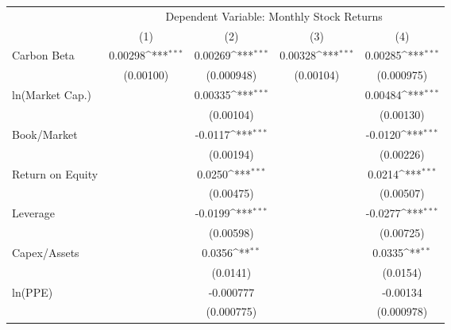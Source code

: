 {
\def\sym#1{\ifmmode^{#1}\else\(^{#1}\)\fi}
\begin{tabular}{l*{4}{c}}
\hline\hline
                    &\multicolumn{4}{c}{Dependent Variable: Monthly Stock Returns}                          \\\cmidrule(lr){2-5}
                    &\multicolumn{1}{c}{(1)}         &\multicolumn{1}{c}{(2)}         &\multicolumn{1}{c}{(3)}         &\multicolumn{1}{c}{(4)}         \\
\hline
Carbon Beta         &     0.00298\sym{***}&     0.00269\sym{***}&     0.00328\sym{***}&     0.00285\sym{***}\\
                    &   (0.00100)         &  (0.000948)         &   (0.00104)         &  (0.000975)         \\
ln(Market Cap.)     &                     &     0.00335\sym{***}&                     &     0.00484\sym{***}\\
                    &                     &   (0.00104)         &                     &   (0.00130)         \\
Book/Market         &                     &     -0.0117\sym{***}&                     &     -0.0120\sym{***}\\
                    &                     &   (0.00194)         &                     &   (0.00226)         \\
Return on Equity    &                     &      0.0250\sym{***}&                     &      0.0214\sym{***}\\
                    &                     &   (0.00475)         &                     &   (0.00507)         \\
Leverage            &                     &     -0.0199\sym{***}&                     &     -0.0277\sym{***}\\
                    &                     &   (0.00598)         &                     &   (0.00725)         \\
Capex/Assets        &                     &      0.0356\sym{**} &                     &      0.0335\sym{**} \\
                    &                     &    (0.0141)         &                     &    (0.0154)         \\
ln(PPE)             &                     &   -0.000777         &                     &    -0.00134         \\
                    &                     &  (0.000775)         &                     &  (0.000978)         \\

\end{tabular}}
